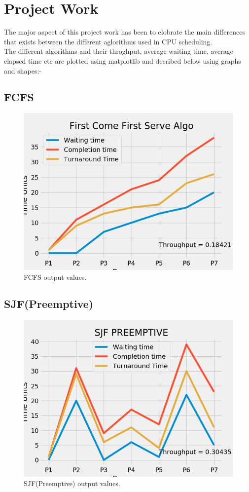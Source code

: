 \documentclass[11pt,a4paper]{report}
\begin{document}
		\section*{Project Work}
		\vskip 1cm
		{\large{The major aspect of this project work has been to elobrate the main differences that exists between the different aglorithms used in CPU scheduling.\\ The different algorithms and their throghput, average waiting time, average elapsed time etc are plotted using matplotlib and decribed  below using graphs and shapes:-}
		\vskip 2cm
		\subsection*{FCFS}
		{\begin{figure}[H]
		\centering
		\includegraphics[scale=0.8]{FCFS_output.png}
		\caption{FCFS output values.}
		\end{figure}}
		\subsection*{SJF(Preemptive)}
		{\begin{figure}[H]
		    \centering
		    \includegraphics[scale=0.75]{SJF_P_output.png}
		    \caption{SJF(Preemptive) output values.}
		\end{figure}}
}
\end{document}
